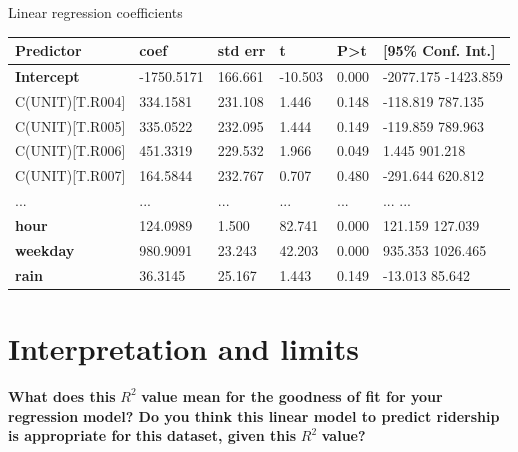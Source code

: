 \documentclass[a4paper,12pt,english]{sphinxmanual}
\begin{document}
\label{section2:table32}

\begin{threeparttable}
\capstart\caption{Linear regression coefficients}

\begin{tabulary}{\linewidth}{|L|L|L|L|L|L|}
\hline
\textsf{\relax 
Predictor
} & \textsf{\relax 
coef
} & \textsf{\relax 
std err
} & \textsf{\relax 
t
} & \textsf{\relax 
P\textgreater{}\textbar{}t\textbar{}
} & \textsf{\relax 
{[}95\% Conf. Int.{]}
}\\
\hline
\textbf{Intercept}
 & 
-1750.5171
 & 
166.661
 & 
-10.503
 & 
0.000
 & 
-2077.175 -1423.859
\\

C(UNIT){[}T.R004{]}
 & 
334.1581
 & 
231.108
 & 
1.446
 & 
0.148
 & 
-118.819   787.135
\\

C(UNIT){[}T.R005{]}
 & 
335.0522
 & 
232.095
 & 
1.444
 & 
0.149
 & 
-119.859   789.963
\\

C(UNIT){[}T.R006{]}
 & 
451.3319
 & 
229.532
 & 
1.966
 & 
0.049
 & 
1.445   901.218
\\

C(UNIT){[}T.R007{]}
 & 
164.5844
 & 
232.767
 & 
0.707
 & 
0.480
 & 
-291.644   620.812
\\

...
 & 
...
 & 
...
 & 
...
 & 
...
 & 
...       ...
\\

\textbf{hour}
 & 
124.0989
 & 
1.500
 & 
82.741
 & 
0.000
 & 
121.159   127.039
\\

\textbf{weekday}
 & 
980.9091
 & 
23.243
 & 
42.203
 & 
0.000
 & 
935.353  1026.465
\\

\textbf{rain}
 & 
36.3145
 & 
25.167
 & 
1.443
 & 
0.149
 & 
-13.013    85.642
\\
\hline\end{tabulary}

\end{threeparttable}



\section{Interpretation and limits}
\label{section2:interpretation-and-limits}
\textbf{What does this} \(R^2\) \textbf{value mean for the goodness of fit for your regression}
\textbf{model? Do you think this linear model to predict ridership is appropriate for}
\textbf{this dataset, given this} \(R^2\) \textbf{value?}
\end{document}
